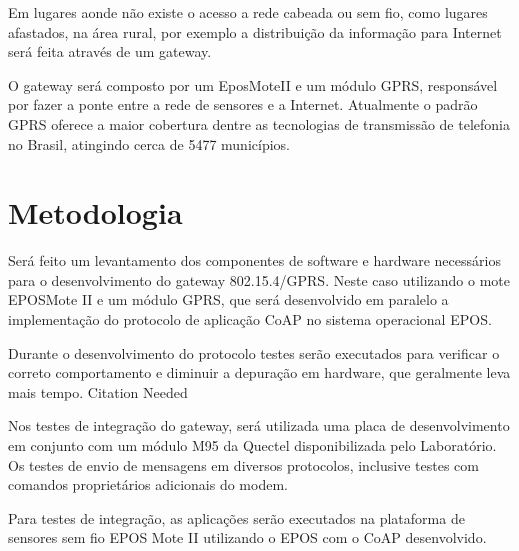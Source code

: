 Em lugares aonde n\~ao existe o acesso a rede cabeada ou sem fio, como lugares afastados, na \'area rural, por exemplo a distribui\c{c}\~ao da informa\c{c}\~ao para Internet ser\'a feita atrav\'es de um gateway.

O gateway ser\'a composto por um EposMoteII e um m\'odulo GPRS, respons\'avel por fazer a ponte entre a rede de sensores e a Internet. Atualmente o padr\~ao GPRS oferece a maior cobertura dentre as tecnologias de transmiss\~ao de telefonia no Brasil, atingindo cerca de 5477 munic\'ipios.\cite{coberturaGPRS}


\section{Metodologia}

Ser\'a feito um levantamento dos componentes de software e hardware necess\'arios para o desenvolvimento do gateway 802.15.4/GPRS. Neste caso utilizando o mote EPOSMote II e um m\'odulo GPRS, que ser\'a desenvolvido em paralelo a implementa\c{c}\~ao do protocolo de aplica\c{c}\~ao CoAP no sistema operacional EPOS.

Durante o desenvolvimento do protocolo testes ser\~ao executados para verificar o correto comportamento e diminuir a depura\c{c}\~ao em hardware, que geralmente leva mais tempo. Citation Needed

Nos testes de integra\c{c}\~ao do gateway, ser\'a utilizada uma placa de desenvolvimento em conjunto com um m\'odulo M95 da Quectel disponibilizada pelo Laborat\'orio. Os testes de envio de mensagens em diversos protocolos, inclusive testes com comandos propriet\'arios adicionais do modem.

Para testes de integra\c{c}\~ao, as aplica\c{c}\~oes ser\~ao executados na plataforma de sensores sem fio EPOS Mote II utilizando o EPOS com o CoAP desenvolvido.
